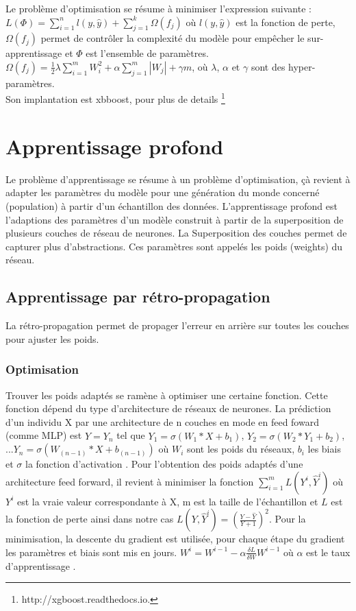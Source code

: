 Le problème d'optimisation se résume à minimiser l'expression suivante : \\
$L(\Phi) = \sum \limits_{i=1}^n l(y, \widehat{y}) + \sum \limits_{j=1}^k \Omega(f_j)$ où $l(y, \widehat{y})$ est la fonction de perte, $\Omega(f_j)$ permet de contrôler la complexité du modèle pour empêcher le sur-apprentissage et $\Phi$ est l'ensemble de paramètres. $\Omega(f_j) = \frac{1}{2} \lambda \sum \limits_{i=1}^m W_{i}^2 + \alpha\sum \limits_{j = 1}^m |W_j| + \gamma m$, où $\lambda$, $\alpha$ et $\gamma$ sont des hyper-paramètres. \\Son implantation est xbboost, pour plus de details \footnote{http://xgboost.readthedocs.io.}

\section{Apprentissage profond}
Le problème d'apprentissage se résume à un problème d'optimisation, çà revient à adapter les paramètres du modèle pour une génération du monde concerné (population) à partir d'un échantillon des données. L'apprentissage profond est l'adaptions des paramètres d'un modèle construit à partir de la superposition de plusieurs couches de réseau de neurones. La Superposition des couches permet de capturer plus d'abstractions. Ces paramètres sont appelés les poids (weights) du réseau.
\subsection{Apprentissage par rétro-propagation}
La rétro-propagation permet de propager l'erreur en arrière sur toutes les couches pour ajuster les poids.
\subsubsection{Optimisation}
Trouver les poids adaptés se ramène à optimiser une certaine fonction. Cette fonction dépend du type d'architecture de réseaux de neurones. La prédiction d'un individu X par une architecture de n couches en mode en feed foward (comme MLP) est $\widehat{Y} = Y_n$ tel que $Y_1 = \sigma(W_1*X + b_1)$, $Y_2 = \sigma(W_2*Y_1 + b_2)$, $... Y_n = \sigma(W_(n-1)*X + b_(n-1))$ où $W_i$ sont les poids du réseaux, $b_i$ les biais et $\sigma$ la fonction d'activation \cite{relu, rnna, erc, ...}. Pour l'obtention des poids adaptés d'une architecture feed forward, il revient à minimiser la fonction $\sum \limits_{i=1}^m L(Y^i, \widehat{Y}^i)$ où $Y^i$ est la vraie valeur correspondante à X, m est la taille de l'échantillon et $L$ est la fonction de perte ainsi dans notre cas $L(Y, \widehat{Y}^i) = (\frac{Y-\widehat{Y}}{Y+1})^2$. Pour la minimisation, la descente du gradient est utilisée, pour chaque étape du gradient les paramètres et biais sont mis en jours. $W^i = W^{i-1} - \alpha \frac{\delta L}{\delta W} W^{i-1}$ où $\alpha$ est le taux d'apprentissage .\\


